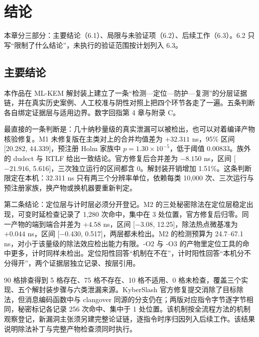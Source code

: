
\section{结论}

本章分三部分：主要结论（6.1）、局限与未验证项（6.2）、后续工作（6.3）。6.2 只写“限制了什么结论”，未执行的验证范围按计划列入 6.3。

\subsection{主要结论}

本作品在 ML-KEM 解封装上建立了一条“检测—定位—防护—复测”的分层证据链，并在真实历史案例、人工校准与阴性对照上把四个环节各走了一遍。五条判断各自绑定证据层与适用边界。数字回指第 4 章与附录 C。%

最直接的一条判断是：几十纳秒量级的真实泄漏可以被检出，也可以对着编译产物核验修复。M1 未修复版在主类对上的合并均值差为 $+32.311$ ns，95\% 区间 [20.282, 44.339]，预注册 Holm 家族中 $p=1.30\times10^{-5}$，低于阈值 0.00833。族外的 dudect\cite{dudect} 与 RTLF\cite{rtlf} 给出一致结论。官方修复后合并差为 $-8.150$ ns，区间 [$-21.916$, 5.616]，三次独立运行的区间都含 0。解封装开销增加 1.51\%。这条判断限定在本机：32.311 ns 只有两三个分辨率单位，依赖每类 10,000 次、三次运行与预注册家族，换产物或换机器要重新判定。%

第二条结论：定位层与计时层必须分开登记。M2 的三处秘密除法在定位层稳定出现，可变时延检查记录了 1,280 次命中，集中在 3 处位置，官方修复后归零。同一产物的端到端合并差为 $+4.58$ ns，区间 [$-3.08$, 12.25]，除法热点微基准为 $+0.044$ ns，区间 [$-0.430$, 0.517]，两层都未检出。M2 的检测预算为 24.7--67.1 ns，对小于该量级的除法效应检出能力有限。-O2 与 -O3 的产物里定位工具的命中更多，计时同样未检出。定位阳性回答“机制在不在”，计时阳性回答“本机分不分得开”，两个证据层独立记录、按层引用。%

90 格排查得到 5 格存在、75 格不存在、10 格不适用、0 格未检查，覆盖三个实现、五个解封装步骤与六类泄漏来源。KyberSlash\cite{kyberslash} 官方修复提交消除了目标除法，但消息编码函数中与 clangover\cite{clangover} 同源的分支仍在；两版对应指令字节逐字节相同，秘密标记各记录 256 次命中、集中于 1 处位置。该机制按全流程方法的机制观察登记，新漏洞主张须另建完整论证链，逐指令时序归因列入后续工作。该结果说明除法补丁与完整产物检查须同时执行。%

